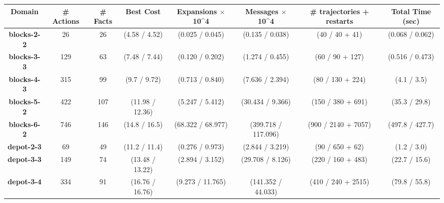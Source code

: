 \documentclass[letterpaper]{article} %
\theoremstyle{remark}
\begin{document}
\begin{table*}[]
\centering
\scriptsize
\begin{tabular}{|c|c|c||c|c|c|c|c|}
\hline
\textbf{Domain}        & \textbf{\# Actions} & \textbf{\# Facts} & \textbf{Best Cost} & \textbf{Expansions $\times$ 10\textasciicircum{}4} & \textbf{Messages $\times$ 10\textasciicircum{}4} & \textbf{\# trajectories + restarts} & \textbf{Total Time (sec)} \\ \hline\hline
\textbf{blocks-2-2}    & 26                  & 26                & (4.58 / 4.52)      & (0.025 / 0.045)                             & (0.135 / 0.038)                           & (40 / 40 + 41)                & (0.068 / 0.062)           \\ \hline
\textbf{blocks-3-3}    & 129                 & 63                & (7.48 / 7.44)      & (0.120 / 0.202)                             & (1.274 / 0.455)                           & (60 / 90 + 127)                & (0.516 / 0.473)           \\ \hline
\textbf{blocks-4-3}    & 315                 & 99                & (9.7 / 9.72)       & (0.713 / 0.840)                             & (7.636 / 2.394)                           & (80 / 130 + 224)               & (4.1 / 3.5)               \\ \hline
\textbf{blocks-5-2}    & 422                 & 107               & (11.98 / 12.36)    & (5.247 / 5.412)                             & (30.434 / 9.366)                          & (150 / 380 + 691)              & (35.3 / 29.8)             \\ \hline
\textbf{blocks-6-2}    & 746                 & 146               & (14.8 / 16.5)      & (68.322 / 68.977)                           & (399.718 / 117.096)                       & (900 / 2140 + 7057)             & (497.8 / 427.7)           \\ \hline\hline
\textbf{depot-2-3}     & 69                  & 49                & (11.2 / 11.4)      & (0.276 / 0.973)                             & (2.844 / 3.219)                           & (90 / 650 + 62)               & (1.2 / 3.0)               \\ \hline
\textbf{depot-3-3}     & 149                 & 74                & (13.48 / 13.22)    & (2.894 / 3.152)                             & (29.708 / 8.126)                          & (220 / 160 + 483)              & (22.7 / 15.6)             \\ \hline
\textbf{depot-3-4}     & 334                 & 91                & (16.76 / 16.76)    & (9.273 / 11.765)                            & (141.352 / 44.033)                        & (410 / 240 + 2515)              & (79.8 / 55.8)             \\ \hline

\end{tabular}
\end{table*}
\end{document}

